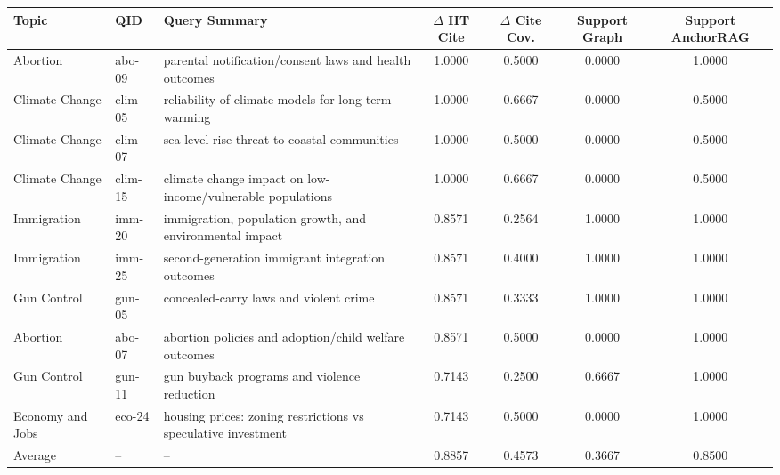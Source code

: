 \begin{tabular}{llp{4.5cm}cccc}
\toprule
Topic & QID & Query Summary & $\Delta$ HT Cite & $\Delta$ Cite Cov. & Support Graph & Support AnchorRAG \\
\midrule
Abortion & abo-09 & parental notification/consent laws and health outcomes & 1.0000 & 0.5000 & 0.0000 & 1.0000 \\
Climate Change & clim-05 & reliability of climate models for long-term warming & 1.0000 & 0.6667 & 0.0000 & 0.5000 \\
Climate Change & clim-07 & sea level rise threat to coastal communities & 1.0000 & 0.5000 & 0.0000 & 0.5000 \\
Climate Change & clim-15 & climate change impact on low-income/vulnerable populations & 1.0000 & 0.6667 & 0.0000 & 0.5000 \\
Immigration & imm-20 & immigration, population growth, and environmental impact & 0.8571 & 0.2564 & 1.0000 & 1.0000 \\
Immigration & imm-25 & second-generation immigrant integration outcomes & 0.8571 & 0.4000 & 1.0000 & 1.0000 \\
Gun Control & gun-05 & concealed-carry laws and violent crime & 0.8571 & 0.3333 & 1.0000 & 1.0000 \\
Abortion & abo-07 & abortion policies and adoption/child welfare outcomes & 0.8571 & 0.5000 & 0.0000 & 1.0000 \\
Gun Control & gun-11 & gun buyback programs and violence reduction & 0.7143 & 0.2500 & 0.6667 & 1.0000 \\
Economy and Jobs & eco-24 & housing prices: zoning restrictions vs speculative investment & 0.7143 & 0.5000 & 0.0000 & 1.0000 \\
Average & -- & -- & 0.8857 & 0.4573 & 0.3667 & 0.8500 \\
\bottomrule
\end{tabular}
